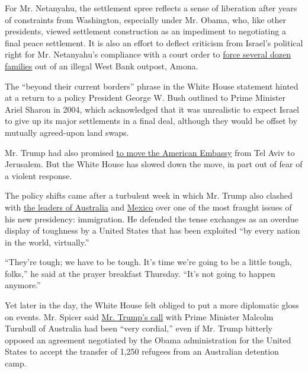 For Mr. Netanyahu, the settlement spree reflects a sense of liberation
after years of constraints from Washington, especially under Mr. Obama,
who, like other presidents, viewed settlement construction as an
impediment to negotiating a final peace settlement. It is also an effort
to deflect criticism from Israel's political right for Mr. Netanyahu's
compliance with a court order to
\href{https://www.nytimes3xbfgragh.onion/video/world/middleeast/100000004906367/jewish-settlers-resist-outpost-evacuation.html}{force
several dozen families} out of an illegal West Bank outpost, Amona.

The ``beyond their current borders'' phrase in the White House statement
hinted at a return to a policy President George W. Bush outlined to
Prime Minister Ariel Sharon in 2004, which acknowledged that it was
unrealistic to expect Israel to give up its major settlements in a final
deal, although they would be offset by mutually agreed-upon land swaps.

Mr. Trump had also promised
\href{https://www.nytimes3xbfgragh.onion/2017/01/19/world/middleeast/donald-trump-jerusalem-embassy-israel-palestinians.html}{to
move the American Embassy} from Tel Aviv to Jerusalem. But the White
House has slowed down the move, in part out of fear of a violent
response.

The policy shifts came after a turbulent week in which Mr. Trump also
clashed with
\href{https://www.nytimes3xbfgragh.onion/2017/02/02/world/australia/donald-trump-malcolm-turnbull-refugees.html}{the
leaders of Australia} and
\href{https://www.nytimes3xbfgragh.onion/2017/01/26/world/americas/mexico-pena-nieto-donald-trump.html}{Mexico}
over one of the most fraught issues of his new presidency: immigration.
He defended the tense exchanges as an overdue display of toughness by a
United States that has been exploited ``by every nation in the world,
virtually.''

``They're tough; we have to be tough. It's time we're going to be a
little tough, folks,'' he said at the prayer breakfast Thursday. ``It's
not going to happen anymore.''

Yet later in the day, the White House felt obliged to put a more
diplomatic gloss on events. Mr. Spicer said
\href{https://www.nytimes3xbfgragh.onion/2017/02/02/us/politics/us-australia-trump-turnbull.html}{Mr.
Trump's call} with Prime Minister Malcolm Turnbull of Australia had been
``very cordial,'' even if Mr. Trump bitterly opposed an agreement
negotiated by the Obama administration for the United States to accept
the transfer of 1,250 refugees from an Australian detention camp.

